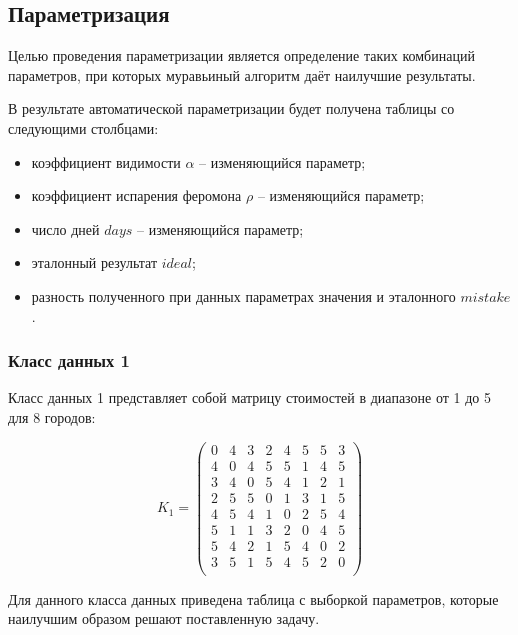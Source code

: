 \pagebreak
\subsection{Параметризация}

Целью проведения параметризации является определение таких комбинаций параметров, при которых муравьиный алгоритм даёт наилучшие результаты.

В результате автоматической параметризации будет получена таблицы со следующими столбцами:
\begin{itemize}[label*=---]
	\item коэффициент видимости $\alpha$ -- изменяющийся параметр;
	\item коэффициент испарения феромона $\rho$ -- изменяющийся параметр;
	\item число дней $days$ -- изменяющийся параметр;
	\item эталонный результат $ideal$;
	\item разность полученного при данных параметрах значения и эталонного $mistake$.
\end{itemize}

\subsubsection{Класс данных 1}

Класс данных 1 представляет собой матрицу стоимостей в диапазоне от 1 до 5 для 8 городов:

\begin{equation}
	\label{eq:kd1}
	K_{1} = \begin{pmatrix}
		0 & 4 & 3 & 2 & 4 & 5 & 5 & 3 \\
		4 & 0 & 4 & 5 & 5 & 1 & 4 & 5 \\
		3 & 4 & 0 & 5 & 4 & 1 & 2 & 1 \\
		2 & 5 & 5 & 0 & 1 & 3 & 1 & 5 \\
		4 & 5 & 4 & 1 & 0 & 2 & 5 & 4 \\
		5 & 1 & 1 & 3 & 2 & 0 & 4 & 5 \\
		5 & 4 & 2 & 1 & 5 & 4 & 0 & 2 \\
		3 & 5 & 1 & 5 & 4 & 5 & 2 & 0 \\
	\end{pmatrix}
\end{equation}

Для данного класса данных приведена таблица с выборкой параметров, которые наилучшим образом решают поставленную задачу.

